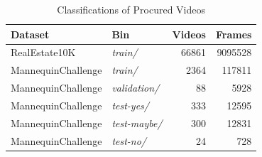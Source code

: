 \begin{table}[t]
    \centering
    \begin{tabular}{L|M|N|N}
    \toprule
  
    \textbf{Dataset} & \textbf{Bin} & \textbf{Videos} & \textbf{Frames} \\
    
    \midrule
    
    RealEstate10K & \textit{train/} & 66861 & 9095528 \\

    \cmidrule(lr){1-1} \cmidrule(lr){2-2} \cmidrule(lr){3-3} \cmidrule(lr){4-4}
    
    MannequinChallenge & \textit{train/} & 2364 & 117811 \\
    
    \cmidrule(lr){1-1} \cmidrule(lr){2-2} \cmidrule(lr){3-3} \cmidrule(lr){4-4}
    
    MannequinChallenge & \textit{validation/} & 88 & 5928 \\
    
    \cmidrule(lr){1-1} \cmidrule(lr){2-2} \cmidrule(lr){3-3} \cmidrule(lr){4-4}
    
    MannequinChallenge & \textit{test-yes/} & 333 & 12595 \\
    
    \cmidrule(lr){1-1} \cmidrule(lr){2-2} \cmidrule(lr){3-3} \cmidrule(lr){4-4}
    
    MannequinChallenge & \textit{test-maybe/} & 300 & 12831 \\
    
    \cmidrule(lr){1-1} \cmidrule(lr){2-2} \cmidrule(lr){3-3} \cmidrule(lr){4-4}
    
    MannequinChallenge & \textit{test-no/} & 24 & 728 \\
    
    \bottomrule
    \end{tabular}
    \caption{Classifications of Procured Videos}
    \label{tab:video-classifications}
\end{table}

